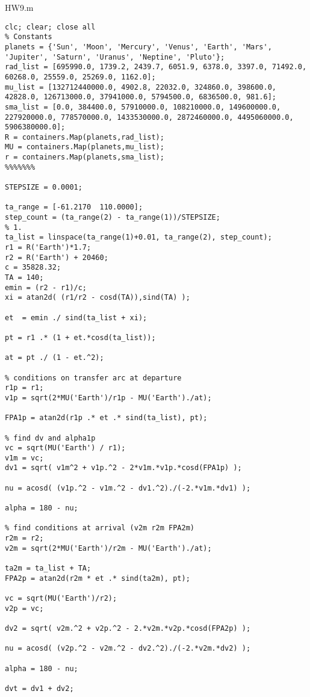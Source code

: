 HW9.m
\begin{lstlisting}[frame=lines,style=Matlab-editor,basicstyle = \mlttfamily]
clc; clear; close all
% Constants
planets = {'Sun', 'Moon', 'Mercury', 'Venus', 'Earth', 'Mars', 'Jupiter', 'Saturn', 'Uranus', 'Neptine', 'Pluto'};
rad_list = [695990.0, 1739.2, 2439.7, 6051.9, 6378.0, 3397.0, 71492.0, 60268.0, 25559.0, 25269.0, 1162.0];
mu_list = [132712440000.0, 4902.8, 22032.0, 324860.0, 398600.0, 42828.0, 126713000.0, 37941000.0, 5794500.0, 6836500.0, 981.6];
sma_list = [0.0, 384400.0, 57910000.0, 108210000.0, 149600000.0, 227920000.0, 778570000.0, 1433530000.0, 2872460000.0, 4495060000.0, 5906380000.0];
R = containers.Map(planets,rad_list);
MU = containers.Map(planets,mu_list);
r = containers.Map(planets,sma_list);
%%%%%%%

STEPSIZE = 0.0001;

ta_range = [-61.2170  110.0000];
step_count = (ta_range(2) - ta_range(1))/STEPSIZE;
% 1.
ta_list = linspace(ta_range(1)+0.01, ta_range(2), step_count);
r1 = R('Earth')*1.7;
r2 = R('Earth') + 20460;
c = 35828.32;
TA = 140;
emin = (r2 - r1)/c;
xi = atan2d( (r1/r2 - cosd(TA)),sind(TA) );

et  = emin ./ sind(ta_list + xi);

pt = r1 .* (1 + et.*cosd(ta_list));

at = pt ./ (1 - et.^2);

% conditions on transfer arc at departure
r1p = r1;
v1p = sqrt(2*MU('Earth')/r1p - MU('Earth')./at);

FPA1p = atan2d(r1p .* et .* sind(ta_list), pt);

% find dv and alpha1p
vc = sqrt(MU('Earth') / r1);
v1m = vc;
dv1 = sqrt( v1m^2 + v1p.^2 - 2*v1m.*v1p.*cosd(FPA1p) );

nu = acosd( (v1p.^2 - v1m.^2 - dv1.^2)./(-2.*v1m.*dv1) );

alpha = 180 - nu;

% find conditions at arrival (v2m r2m FPA2m)
r2m = r2;
v2m = sqrt(2*MU('Earth')/r2m - MU('Earth')./at);

ta2m = ta_list + TA;
FPA2p = atan2d(r2m * et .* sind(ta2m), pt);

vc = sqrt(MU('Earth')/r2);
v2p = vc;

dv2 = sqrt( v2m.^2 + v2p.^2 - 2.*v2m.*v2p.*cosd(FPA2p) );

nu = acosd( (v2p.^2 - v2m.^2 - dv2.^2)./(-2.*v2m.*dv2) );

alpha = 180 - nu;

dvt = dv1 + dv2;


\end{lstlisting}
